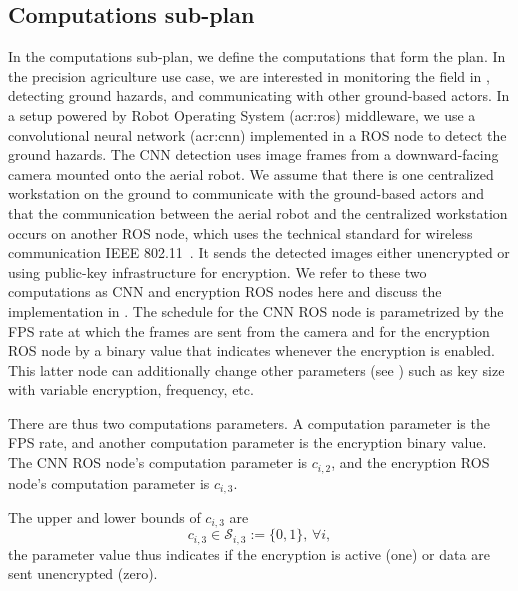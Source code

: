 \subsection{Computations sub-plan}
\label{sec:computation-wise}

In the computations sub-plan, we define the computations that form the plan. In the precision agriculture use case, we are interested in monitoring the field in , detecting ground hazards, and communicating with other ground-based actors. In a setup powered by Robot Operating System (\Gls{acr:ros}) middleware, we use a convolutional neural network (\Gls{acr:cnn}) implemented in a ROS node to detect the ground hazards. The CNN detection uses image frames from a downward-facing camera mounted onto the aerial robot. We assume that there is one centralized workstation on the ground to communicate with the ground-based actors and that the communication between the aerial robot and the centralized workstation occurs on another ROS node, which uses the technical standard for wireless communication IEEE 802.11~\citep{crow1997ieee}. It sends the detected images either unencrypted or using public-key infrastructure for encryption. We refer to these two computations as CNN and encryption ROS nodes here and discuss the implementation in . The schedule for the CNN ROS node is parametrized by the FPS rate at which the frames are sent from the camera and for the encryption ROS node by a binary value that indicates whenever the encryption is enabled. This latter node can additionally change other parameters (see ) such as key size with variable encryption, frequency, etc.

There are thus two computations parameters. A computation parameter is the FPS rate, and another computation parameter is the encryption binary value. The CNN ROS node's computation parameter is $c_{i,2}$, and the encryption ROS node's computation parameter is $c_{i,3}$.

The upper and lower bounds of $c_{i,3}$ are 
\begin{equation}\label{eq:encr-comp-const}
  c_{i,3}\in\mathcal{S}_{i,3}:=\{0,1\},\,\forall i,
\end{equation}
the parameter value thus indicates if the encryption is active (one) or data are sent unencrypted (zero).

